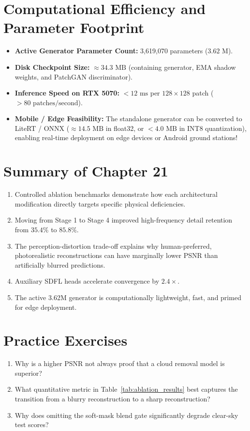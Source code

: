 \section{Computational Efficiency and Parameter Footprint}
\begin{itemize}
    \item \textbf{Active Generator Parameter Count:} 3,619,070 parameters ($3.62\text{ M}$).
    \item \textbf{Disk Checkpoint Size:} $\approx 34.3\text{ MB}$ (containing generator, EMA shadow weights, and PatchGAN discriminator).
    \item \textbf{Inference Speed on RTX 5070:} $<12\text{ ms}$ per $128 \times 128$ patch ($>80\text{ patches/second}$).
    \item \textbf{Mobile / Edge Feasibility:} The standalone generator can be converted to LiteRT / ONNX ($\approx 14.5\text{ MB}$ in float32, or $<4.0\text{ MB}$ in INT8 quantization), enabling real-time deployment on edge devices or Android ground stations!
\end{itemize}

\section{Summary of Chapter 21}
\begin{enumerate}
    \item Controlled ablation benchmarks demonstrate how each architectural modification directly targets specific physical deficiencies.
    \item Moving from Stage 1 to Stage 4 improved high-frequency detail retention from $35.4\%$ to $85.8\%$.
    \item The perception-distortion trade-off explains why human-preferred, photorealistic reconstructions can have marginally lower PSNR than artificially blurred predictions.
    \item Auxiliary SDFL heads accelerate convergence by $2.4\times$.
    \item The active 3.62M generator is computationally lightweight, fast, and primed for edge deployment.
\end{enumerate}

\section{Practice Exercises}
\begin{enumerate}
    \item Why is a higher PSNR not always proof that a cloud removal model is superior?
    \item What quantitative metric in Table~\ref{tab:ablation_results} best captures the transition from a blurry reconstruction to a sharp reconstruction?
    \item Why does omitting the soft-mask blend gate significantly degrade clear-sky test scores?
\end{enumerate}

